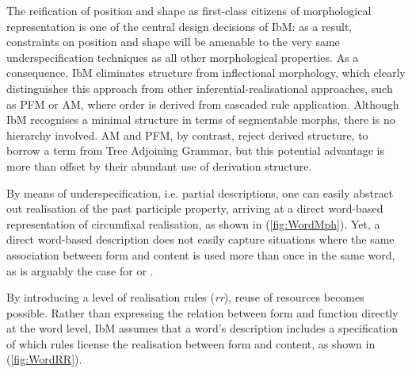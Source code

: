 \documentclass[output=paper
	        ,collection
	        ,collectionchapter
 	        ,biblatex
                ,babelshorthands
                ,newtxmath
                ,draftmode
                ,colorlinks, citecolor=brown
]{langscibook}
\begin{document}
\begin{exe}
\begin{xlist}
\begin{exe}
  \ex \label{ex:mph} 

\end{exe}

The reification of position and shape as first-class citizens of
morphological representation is one of the central design decisions of
IbM: as a result, constraints on position and shape will be amenable
to the very same underspecification techniques as all other
morphological properties. As a consequence, IbM eliminates structure
from inflectional morphology, which clearly distinguishes this
approach from other inferential-realisational approaches, such as PFM or AM,
where order is derived from cascaded rule application.  Although IbM
recognises a minimal structure in terms of segmentable morphs, there
is no hierarchy involved. AM and PFM, by contrast, reject derived
structure, to borrow a term from Tree Adjoining Grammar, but this
potential advantage is more than  offset by their abundant use of
derivation structure.

By means of underspecification, i.e. partial descriptions, one can
easily abstract out realisation of the past participle property,
arriving at a direct word-based representation of circumfixal
realisation, as shown in (\ref{fig:WordMph}).  Yet, a direct
word-based description does not easily capture situations where the
same association between form and content is used more than once in
the same word, as is arguably the case for 
\citep{Stump93,Crysmann:Bonami:2016,Crysmann:Bonami:2017:HPSG} or  \citep{Harris09,Crysmann:2018:Batsbi}.

By  introducing a level of realisation rules (\textit{rr}), reuse
of resources becomes possible. Rather than expressing the relation
between form and function directly at the word level, IbM assumes that
a word's description includes a specification of which rules license
the realisation between form and content, as shown in 
(\ref{fig:WordRR}).



\end{xlist}
\end{exe}
\end{document}
